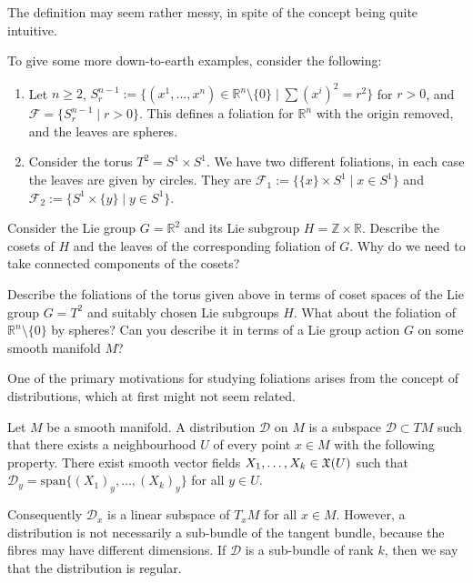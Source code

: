 The definition may seem rather messy, in spite of the concept being quite intuitive.
\begin{example}
  To give some more down-to-earth examples, consider the following:
  \begin{enumerate}\label{foliations}
    \item Let $n\geq2$, $S^{n-1}_r:=\{(x^1,\dots,x^n)\in\mathbb{R}^n\setminus \{0\}\mid \sum (x^i)^2=r^2\}$ for $r>0$, and $\mathcal{F}=\{S^{n-1}_r\mid r>0\}$. This defines a foliation for $\mathbb{R}^n$ with the origin removed, and the leaves are spheres.
    \item Consider the torus $T^2=S^1\times S^1$. We have two different foliations, in each case the leaves are given by circles. They are $\mathcal{F}_1:=\{\{x\}\times S^1\mid x\in S^1\}$ and $\mathcal{F}_2:=\{S^1\times\{y\}\mid y\in S^1\}$.
  \end{enumerate}
\end{example}
\begin{exercise}
  Consider the Lie group $G=\mathbb{R}^2$ and its Lie subgroup $H=\mathbb{Z}\times\mathbb{R}$. Describe the cosets of $H$ and the leaves of the corresponding foliation of $G$. Why do we need to take connected components of the cosets?
\end{exercise}
\begin{exercise}
  Describe the foliations of the torus given above in terms of coset spaces of the Lie group $G=T^2$ and suitably chosen Lie subgroups $H$. What about the foliation of $\mathbb{R}^n\setminus\{0\}$ by spheres? Can you describe it in terms of a Lie group action $G$ on some smooth manifold $M$?
\end{exercise}
One of the primary motivations for studying foliations arises from the concept of distributions, which at first might not seem related.
\begin{definition}
  Let $M$ be a smooth manifold. A distribution $\mathcal{D}$ on $M$ is a subspace $\mathcal{D}\subset TM$ such that there exists a neighbourhood $U$ of every point $x\in M$ with the following property. There exist smooth vector fields $X_1,\dots,X_k\in\mathfrak{X}(U)$ such that $\mathcal{D}_y=\text{span}\{(X_1)_y,\dots,(X_k)_y\}$ for all $y\in U$.
\end{definition}
Consequently $\mathcal{D}_x$ is a linear subspace of $T_xM$ for all $x\in M$. However, a distribution is not necessarily a sub-bundle of the tangent bundle, because the fibres may have different dimensions. If $\mathcal{D}$ is a sub-bundle of rank $k$, then we say that the distribution is regular. \par
